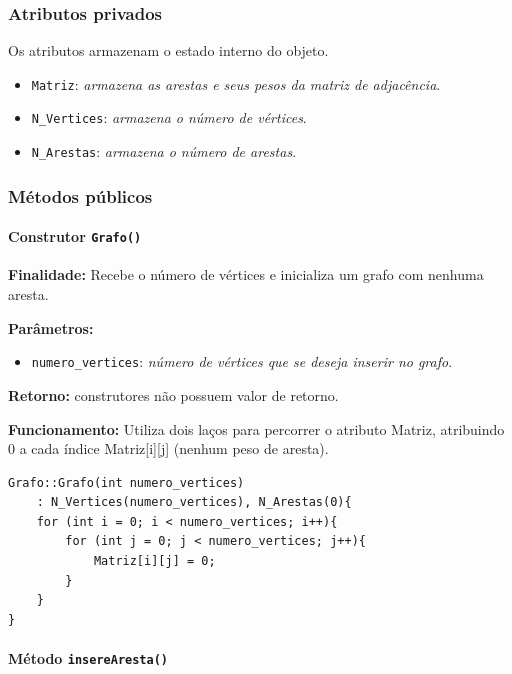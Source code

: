 \documentclass{article}
\begin{document}
\subsubsection*{Atributos privados}

    Os atributos armazenam o estado interno do objeto.

\begin{itemize}
    \item \texttt{Matriz}: \textit{armazena as arestas e seus pesos da matriz de adjacência}.
    \item \texttt{N\_Vertices}: \textit{armazena o número de vértices}.
    \item \texttt{N\_Arestas}: \textit{armazena o número de arestas}.
\end{itemize}

\subsubsection*{Métodos públicos}
\paragraph{Construtor \texttt{Grafo()}}

    \mbox{}\par
    \noindent
    \textbf{Finalidade:} Recebe o número de vértices e inicializa um grafo com nenhuma aresta.

    \textbf{Parâmetros:}
    \begin{itemize}
        \item \texttt{numero\_vertices}: \textit{número de vértices que se deseja inserir no grafo}.
    \end{itemize}

    \textbf{Retorno:} construtores não possuem valor de retorno.

    \textbf{Funcionamento:} Utiliza dois laços para percorrer o atributo Matriz, atribuindo 0 a cada índice Matriz[i][j] (nenhum peso de aresta).

\begin{verbatim}
Grafo::Grafo(int numero_vertices)
    : N_Vertices(numero_vertices), N_Arestas(0){
    for (int i = 0; i < numero_vertices; i++){
        for (int j = 0; j < numero_vertices; j++){
            Matriz[i][j] = 0;
        }
    }
}
\end{verbatim}
\paragraph{Método \texttt{insereAresta()}}
\end{document}
